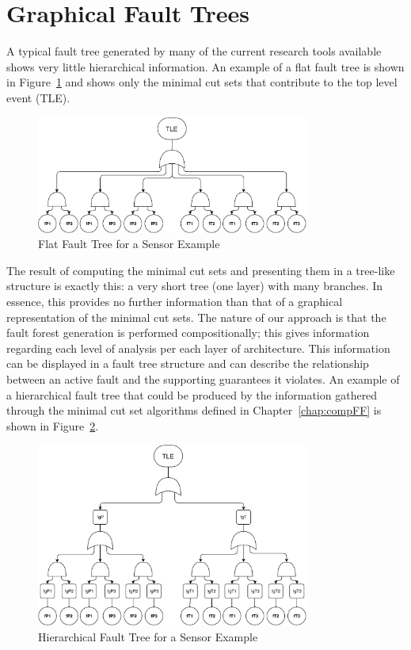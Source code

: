 \section{Graphical Fault Trees}
A typical fault tree generated by many of the current research tools available shows very little hierarchical information. An example of a flat fault tree is shown in Figure~\ref{fig:flatFT} and shows only the minimal cut sets that contribute to the top level event (TLE). 
\begin{figure}[h!]
	\centering
	\includegraphics[trim=0 0 0 0,clip,width=0.8\textwidth]{images/flatFT.pdf}
	\caption{Flat Fault Tree for a Sensor Example}
	\label{fig:flatFT}
\end{figure}

The result of computing the minimal cut sets and presenting them in a tree-like structure is exactly this: a very short tree (one layer) with many branches. In essence, this provides no further information than that of a graphical representation of the minimal cut sets. The nature of our approach is that the fault forest generation is performed compositionally; this gives information regarding each level of analysis per each layer of architecture. This information can be displayed in a fault tree structure and can describe the relationship between an active fault and the supporting guarantees it violates. An example of a hierarchical fault tree that could be produced by the information gathered through the minimal cut set algorithms defined in Chapter~\ref{chap:compFF} is shown in Figure~\ref{fig:ftSensor}. 

\begin{figure}[h!]
	\centering
	\includegraphics[trim=0 0 0 0,clip,width=0.8\textwidth]{images/ftSensor.pdf}
	\caption{Hierarchical Fault Tree for a Sensor Example}
	\label{fig:ftSensor}
\end{figure}

